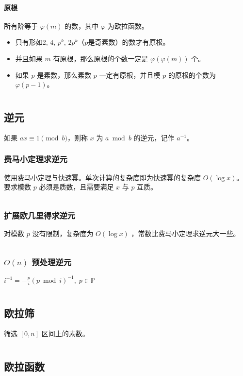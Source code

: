\documentclass[a4paper, twoside]{article}
\begin{document}
\paragraph{原根} 所有阶等于 $\varphi(m)$ 的数，其中 $\varphi$ 为欧拉函数。
\begin{itemize}
    \item 只有形如$2,\, 4,\, p^k,\, 2 p^k$（$p$是奇素数）的数才有原根。
    \item 并且如果 $m$ 有原根，那么原根的个数一定是 $\varphi\left(\varphi(m)\right)$ 个。
    \item 如果 $p$ 是素数，那么素数 $p$ 一定有原根，并且模 $p$ 的原根的个数为 $\varphi(p − 1)$。
\end{itemize}
\inputminted{cpp}{../src/数论/原根.cpp}


\subsection{逆元}
如果 $ax \equiv 1\pmod b$，则称 $x$ 为 $a \bmod b$ 的逆元，记作 $a^{-1}$。
    \subsubsection{费马小定理求逆元}
    使用费马小定理与快速幂。单次计算的复杂度即为快速幂的复杂度 $O(\log x)$。要求模数 $p$ 必须是质数，且需要满足 $x$ 与 $p$ 互质。
    \inputminted{cpp}{../src/数论/费马小定理求逆元.cpp}

    \subsubsection{扩展欧几里得求逆元}
    对模数 $p$ 没有限制，复杂度为 $O(\log x)$ ，常数比费马小定理求逆元大一些。
    \inputminted{cpp}{../src/数论/扩展欧几里得求逆元.cpp}

    \subsubsection{$O(n)$ 预处理逆元}
    $i ^ {-1} = - \frac p i \left( p \bmod i \right) ^ {-1},\; p \in \mathbb{P}$
    \inputminted{cpp}{../src/数论/O(n)预处理逆元.cpp}

\subsection{欧拉筛}
筛选 $[0,n]$ 区间上的素数。
\inputminted{cpp}{../src/数论/欧拉筛.cpp}

\subsection{欧拉函数}
\end{document}
